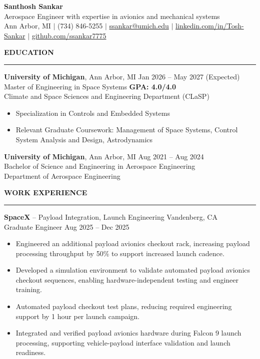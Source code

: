 \documentclass[10pt]{article}
\newcommand{\ressection}[1]{
  \vspace{0.25em}
  {\large\bfseries #1}\par
  \vspace{0.08em}\hrule\vspace{0.20em}
}
\begin{document}
\begin{center}
{\LARGE {\bfseries Santhosh Sankar}} \\
{\small Aerospace Engineer with expertise in avionics and mechanical systems} \\
Ann Arbor, MI \enspace $\vert$ \enspace (734) 846-5255 \enspace $\vert$ \enspace
\href{mailto:ssankar@umich.edu}{ssankar@umich.edu} \enspace $\vert$ \enspace
\href{https://www.linkedin.com/in/santhosh-sankar-3241521b8/}{linkedin.com/in/Tosh-Sankar} \enspace $\vert$ \enspace
\href{https://github.com/ssankar7775}{github.com/ssankar7775}
\end{center}

\ressection{EDUCATION}

{\bfseries University of Michigan}, Ann Arbor, MI \hfill Jan 2026 -- May 2027 (Expected) \\
Master of Engineering in Space Systems \hfill {\bfseries GPA: 4.0/4.0} \\
Climate and Space Sciences and Engineering Department (CLaSP)

\begin{itemize}
  \item Specialization in Controls and Embedded Systems
  \item Relevant Graduate Coursework: Management of Space Systems, Control System Analysis and Design, Astrodynamics
\end{itemize}

{\bfseries University of Michigan}, Ann Arbor, MI \hfill Aug 2021 -- Aug 2024 \\
Bachelor of Science and Engineering in Aerospace Engineering \\
Department of Aerospace Engineering

\ressection{WORK EXPERIENCE}

{\bfseries SpaceX} -- Payload Integration, Launch Engineering \hfill Vandenberg, CA \\
Graduate Engineer \hfill Aug 2025 -- Dec 2025
\begin{itemize}
\item Engineered an additional payload avionics checkout rack, increasing payload processing throughput by 50\% to support increased launch cadence.
\item Developed a simulation environment to validate automated payload avionics checkout sequences, enabling hardware-independent testing and engineer training.
\item Automated payload checkout test plans, reducing required engineering support by 1 hour per launch campaign.
\item Integrated and verified payload avionics hardware during Falcon 9 launch processing, supporting vehicle-payload interface validation and launch readiness.
\end{itemize}
\end{document}
